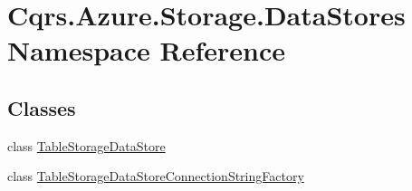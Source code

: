 \hypertarget{namespaceCqrs_1_1Azure_1_1Storage_1_1DataStores}{}\section{Cqrs.\+Azure.\+Storage.\+Data\+Stores Namespace Reference}
\label{namespaceCqrs_1_1Azure_1_1Storage_1_1DataStores}
\subsection*{Classes}
\begin{DoxyCompactItemize}
\item 
class \hyperlink{classCqrs_1_1Azure_1_1Storage_1_1DataStores_1_1TableStorageDataStore}{Table\+Storage\+Data\+Store}
\item 
class \hyperlink{classCqrs_1_1Azure_1_1Storage_1_1DataStores_1_1TableStorageDataStoreConnectionStringFactory}{Table\+Storage\+Data\+Store\+Connection\+String\+Factory}
\end{DoxyCompactItemize}

